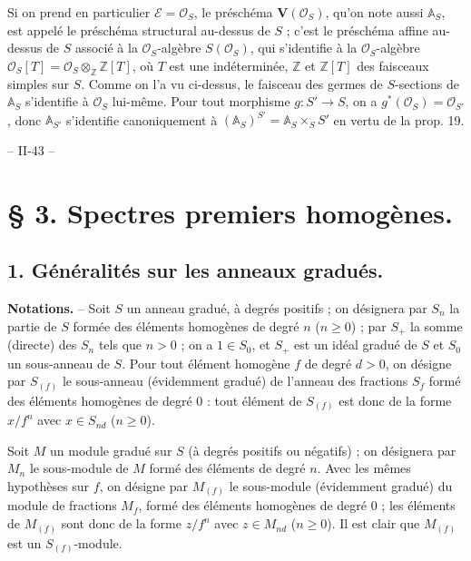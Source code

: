 Si on prend en particulier $\mathcal{E} = \mathcal{O}_S$, le préschéma $\mathbf{V}(\mathcal{O}_S)$, qu'on note aussi $\mathbb{A}_S$, est appelé le préschéma structural au-dessus de $S$ ; c'est le préschéma affine au-dessus de $S$ associé à la $\mathcal{O}_S$-algèbre $S(\mathcal{O}_S)$, qui s'identifie à la $\mathcal{O}_S$-algèbre $\mathcal{O}_S[T] = \mathcal{O}_S \otimes_{\mathbb{Z}} \mathbb{Z}[T]$, où $T$ est une indéterminée, $\mathbb{Z}$ et $\mathbb{Z}[T]$ des faisceaux simples sur $S$. Comme on l'a vu ci-dessus, le faisceau des germes de $S$-sections de $\mathbb{A}_S$ s'identifie à $\mathcal{O}_S$ lui-même. Pour tout morphisme $g : S' \to S$, on a $g^*(\mathcal{O}_S) = \mathcal{O}_{S'}$, donc $\mathbb{A}_{S'}$ s'identifie canoniquement à $(\mathbb{A}_S)^{S'} = \mathbb{A}_S \times_S S'$ en vertu de la prop. 19.

\newpage



\centerline{-- II-43 --}

\section*{§ 3. Spectres premiers homogènes.}

\subsection*{1. Généralités sur les anneaux gradués.}

\noindent \textbf{Notations.} --
Soit $S$ un anneau gradué, à degrés positifs ; on désignera par $S_n$ la partie de $S$ formée des éléments homogènes de degré $n$ ($n \ge 0$) ; par $S_+$ la somme (directe) des $S_n$ tels que $n > 0$ ; on a $1 \in S_0$, et $S_+$ est un idéal gradué de $S$ et $S_0$ un sous-anneau de $S$. Pour tout élément homogène $f$ de degré $d > 0$, on désigne par $S_{(f)}$ le sous-anneau (évidemment gradué) de l'anneau des fractions $S_f$ formé des éléments homogènes de degré $0$ : tout élément de $S_{(f)}$ est donc de la forme $x/f^n$ avec $x \in S_{nd}$ ($n \ge 0$).

Soit $M$ un module gradué sur $S$ (à degrés positifs ou négatifs) ; on désignera par $M_n$ le sous-module de $M$ formé des éléments de degré $n$. Avec les mêmes hypothèses sur $f$, on désigne par $M_{(f)}$ le sous-module (évidemment gradué) du module de fractions $M_f$, formé des éléments homogènes de degré $0$ ; les éléments de $M_{(f)}$ sont donc de la forme $z/f^n$ avec $z \in M_{nd}$ ($n \ge 0$). Il est clair que $M_{(f)}$ est un $S_{(f)}$-module.

